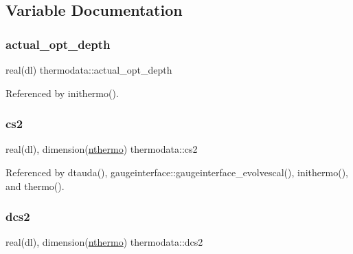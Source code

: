 \subsection{Variable Documentation}
\mbox{\label{namespacethermodata_a9d1b4188f1f98683027a29df3cbdd586}} 
\subsubsection{\texorpdfstring{actual\+\_\+opt\+\_\+depth}{actual\_opt\_depth}}
{\footnotesize\ttfamily real(dl) thermodata\+::actual\+\_\+opt\+\_\+depth\hspace{0.3cm}{\ttfamily [private]}}



Referenced by inithermo().

\mbox{\label{namespacethermodata_abdbeec54177b30f0e0c16f4915bb6963}} 
\subsubsection{\texorpdfstring{cs2}{cs2}}
{\footnotesize\ttfamily real(dl), dimension(\mbox{\hyperlink{namespacethermodata_ab5a6325bede2b0cce4e867e9e1e18215}{nthermo}}) thermodata\+::cs2\hspace{0.3cm}{\ttfamily [private]}}



Referenced by dtauda(), gaugeinterface\+::gaugeinterface\+\_\+evolvescal(), inithermo(), and thermo().

\mbox{\label{namespacethermodata_aca5f831d6371c97e07b745a1335c43a6}} 
\subsubsection{\texorpdfstring{dcs2}{dcs2}}
{\footnotesize\ttfamily real(dl), dimension(\mbox{\hyperlink{namespacethermodata_ab5a6325bede2b0cce4e867e9e1e18215}{nthermo}}) thermodata\+::dcs2\hspace{0.3cm}{\ttfamily [private]}}



